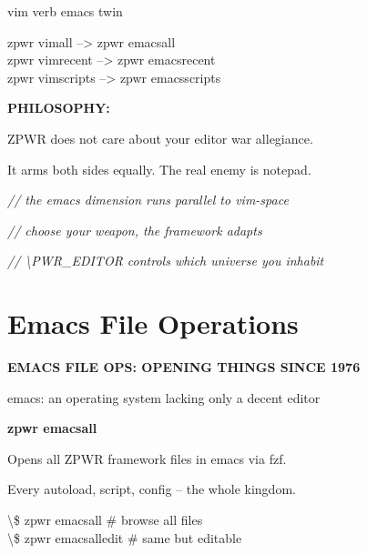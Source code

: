 \documentclass[11pt,a4paper,twoside]{book}
\begin{document}
vim verb              emacs twin

\begin{codebox}
zpwr vimall     -->   zpwr emacsall\\
zpwr vimrecent  -->   zpwr emacsrecent\\
zpwr vimscripts -->   zpwr emacsscripts\\
\end{codebox}


\vspace{12pt}
{\bfseries\color{neonyellow} PHILOSOPHY:}\vspace{4pt}

ZPWR does not care about your editor war allegiance.

It arms both sides equally. The real enemy is notepad.

{\small\itshape\color{dimtext} // the emacs dimension runs parallel to vim-space}

{\small\itshape\color{dimtext} // choose your weapon, the framework adapts}

{\small\itshape\color{dimtext} // \textbackslash{}PWR\_EDITOR controls which universe you inhabit}


\vspace{16pt}

\section{Emacs File Operations}


\vspace{10pt}
{\large\bfseries\color{neoncyan} EMACS FILE OPS: OPENING THINGS SINCE 1976}\vspace{6pt}

emacs: an operating system lacking only a decent editor


\vspace{12pt}
{\bfseries\color{neonyellow} zpwr emacsall}\vspace{4pt}

Opens all ZPWR framework files in emacs via fzf.

Every autoload, script, config -- the whole kingdom.

\begin{codebox}
\textbackslash{}\$ zpwr emacsall              \# browse all files\\
\textbackslash{}\$ zpwr emacsalledit          \# same but editable\\
\end{codebox}
\end{document}

